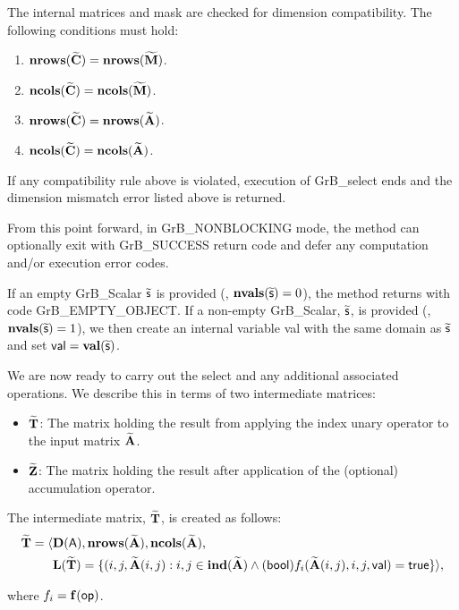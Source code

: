 The internal matrices and mask are checked for dimension compatibility. 
The following conditions must hold:
\begin{enumerate}
    \item $\bold{nrows}({\bf \widetilde{C}}) = \bold{nrows}({\bf \widetilde{M}})$.

    \item $\bold{ncols}({\bf \widetilde{C}}) = \bold{ncols}({\bf \widetilde{M}})$.

    \item $\bold{nrows}({\bf \widetilde{C}}) = \bold{nrows}({\bf \widetilde{A}})$.

    \item $\bold{ncols}({\bf \widetilde{C}}) = \bold{ncols}({\bf \widetilde{A}})$.
\end{enumerate}
If any compatibility rule above is violated, execution of {\sf GrB\_select} ends and 
the dimension mismatch error listed above is returned.

From this point forward, in {\sf GrB\_NONBLOCKING} mode, the method can optionally exit
with {\sf GrB\_SUCCESS} return code and defer any computation and/or execution error codes.

{\color{red}
If an empty {\sf GrB\_Scalar} $\widetilde{\sf s}$ is provided (\ie, $\mathbf{nvals}(\widetilde{\sf s}) = 0$),
the method returns with code {\sf GrB\_EMPTY\_OBJECT}. If a non-empty {\sf GrB\_Scalar}, 
$\widetilde{\sf s}$, is provided (\ie, $\mathbf{nvals}(\widetilde{\sf s}) = 1$), we then create an 
internal variable {\sf val} with the same domain as $\widetilde{\sf s}$ and set 
${\sf val} = \mathbf{val}(\widetilde{\sf s})$.
}

We are now ready to carry out the {\sf select} and any additional 
associated operations.  We describe this in terms of two intermediate matrices:
\begin{itemize}
    \item ${\bf \widetilde{T}}$: The matrix holding the result from applying the index unary operator to the input matrix
    ${\bf \widetilde{A}}$.

    \item ${\bf \widetilde{Z}}$: The matrix holding the result after 
    application of the (optional) accumulation operator.
\end{itemize}

{\color{red}
The intermediate matrix, ${\bf \widetilde{T}}$, is created as follows:
\[
\begin{aligned}
{\bf \widetilde{T}} = \langle & \bold{D}({\sf A}),
                           \bold{nrows}({\bf \widetilde{A}}), 
                           \bold{ncols}({\bf \widetilde{A}}), \\
						  & \bold{L}({\bf \widetilde{T}}) =
    \{(i,j,{\bf \widetilde{A}}(i,j) : {i,j} \in \bold{ind}({\bf \widetilde{A}}) 
	\wedge
({\sf bool})f_i({\bf \widetilde{A}}(i,j),i,j,{\sf val}) = {\sf true} \} \rangle, 
\end{aligned}
\]

where $f_i = \mathbf{f}({\sf op})$.
}




